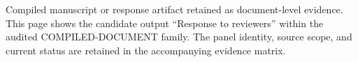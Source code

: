 Compiled manuscript or response artifact retained as document-level evidence. This page shows the candidate output ``Response to reviewers'' within the audited COMPILED-DOCUMENT family. The panel identity, source scope, and current status are retained in the accompanying evidence matrix.
